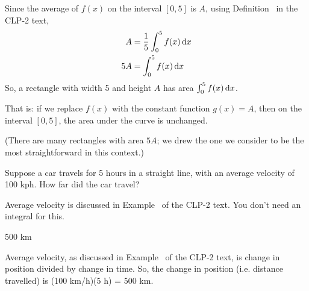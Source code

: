 \begin{solution}
Since the average of $f(x)$ on the interval $[0,5]$ is $A$, using Definition~ in the CLP-2 text,
\begin{align*}
A&=\frac{1}{5}\int_0^5 f(x)\,\mathrm{d}x\\
5A&=\int_0^5 f(x)\,\mathrm{d}x
\end{align*}
So, a rectangle with width 5 and height $A$ has area
$\int_0^5 f(x)\,\mathrm{d}x$.

That is: if we replace $f(x)$ with the constant function $g(x)=A$, then on the interval $[0,5]$, the area under the curve is unchanged.

\begin{center}
\end{center}

(There are many rectangles with area $5A$; we drew the one we consider to be the most straightforward in this context.)
\end{solution}
\begin{question}\label{prob_s2.2:vel}
Suppose a car travels for 5 hours in a straight line, with an average velocity of 100 kph. How far did the car travel?
\end{question}
\begin{hint}
Average velocity is discussed in Example~ of the CLP-2 text.
You don't need an integral for this.
\end{hint}
\begin{answer}
500 km
\end{answer}
\begin{solution}
Average velocity,  as discussed in Example~ of the CLP-2 text,
is change in position divided by change in time. So, the change in position (i.e. distance travelled) is (100 km/h)(5 h) = 500 km.
\end{solution}


